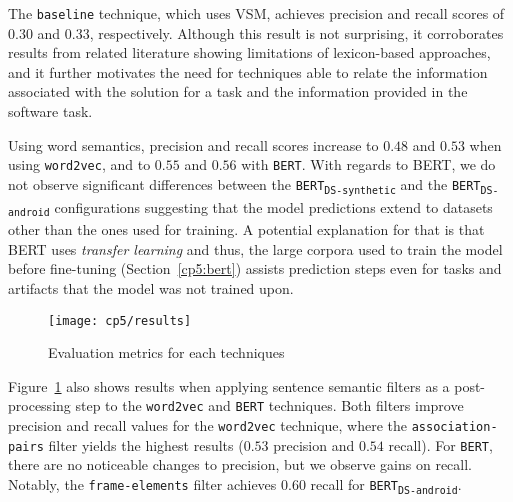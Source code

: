 The \texttt{baseline} technique, which uses VSM, achieves precision and recall scores of $0.30$ and $0.33$, respectively. 
Although this result is not surprising, it corroborates results from related literature showing limitations of lexicon-based approaches, and 
it further motivates the need for techniques able to relate the information associated with the solution for a task and the information provided in the software task.


Using word semantics, precision and recall scores increase to $0.48$ and $0.53$ when using \texttt{word2vec}, and to $0.55$ and $0.56$ with \texttt{BERT}.
With regards to BERT, we do not observe significant differences between the \texttt{BERT\textsubscript{DS-synthetic}}
and the \texttt{BERT\textsubscript{DS-android}} configurations suggesting that the model predictions extend to datasets other than the ones used for training.
A potential explanation for that is that 
BERT uses \textit{transfer learning}  and thus, the  
large corpora used to train the model before fine-tuning (Section~\ref{cp5:bert}) assists prediction steps even for tasks and artifacts that the model was not trained upon.



\clearpage
\begin{landscape}

\begin{figure}
    \centering
    \texttt{[image: cp5/results]}
    \caption{Evaluation metrics for each techniques }
    \label{fig:eval-metrics-results}
\end{figure}
\end{landscape}

\clearpage




Figure~\ref{fig:eval-metrics-results} also shows results when applying sentence semantic filters as
 a post-processing step to the
 \texttt{word2vec} and \texttt{BERT} techniques. 
Both filters improve precision and recall values for the \texttt{word2vec} technique, where the \texttt{association-pairs} filter yields 
the highest results ($0.53$ precision and $0.54$ recall). For \texttt{BERT}, there are no noticeable changes to precision, but 
we observe gains on recall. Notably, the \texttt{frame-elements} filter achieves $0.60$ recall for \texttt{BERT\textsubscript{DS-android}}. 



